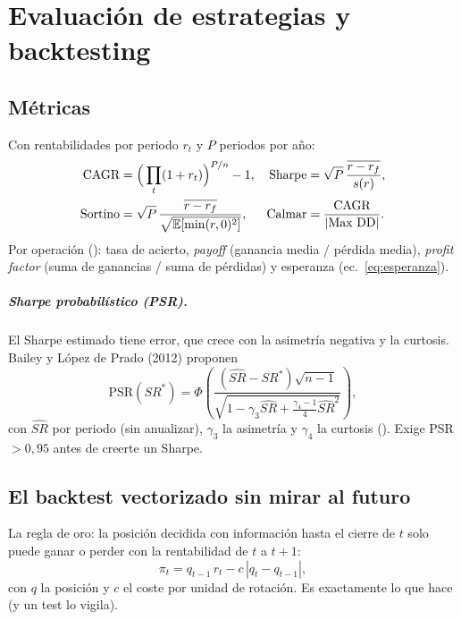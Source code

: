 \chapter{Evaluación de estrategias y backtesting}\label{cap:backtest}

\section{Métricas}
Con rentabilidades por periodo $r_t$ y $P$ periodos por año:
\begin{align*}
\text{CAGR} &= \Big(\prod_t (1+r_t)\Big)^{P/n}-1, &
\text{Sharpe} &= \sqrt{P}\,\frac{\overline{r - r_f}}{s(r)}, \\
\text{Sortino} &= \sqrt{P}\,\frac{\overline{r-r_f}}{\sqrt{\mathbb{E}[\min(r,0)^2]}}, &
\text{Calmar} &= \frac{\text{CAGR}}{|\text{Max DD}|}.
\end{align*}
Por operación (): tasa de acierto, \emph{payoff} (ganancia media / pérdida
media), \emph{profit factor} (suma de ganancias / suma de pérdidas) y esperanza (ec.~\ref{eq:esperanza}).

\paragraph{Sharpe probabilístico (PSR).} El Sharpe estimado tiene error, que crece con la asimetría
negativa y la curtosis. Bailey y López de Prado (2012) proponen
\begin{equation}
\text{PSR}(SR^*) = \Phi\!\left(\frac{(\widehat{SR}-SR^*)\sqrt{n-1}}{\sqrt{1-\gamma_3\widehat{SR}+\frac{\gamma_4-1}{4}\widehat{SR}^2}}\right),
\end{equation}
con $\widehat{SR}$ por periodo (sin anualizar), $\gamma_3$ la asimetría y $\gamma_4$ la curtosis
(). Exige PSR $>0{,}95$ antes de creerte un Sharpe.

\section{El backtest vectorizado sin mirar al futuro}
La regla de oro: la posición decidida con información hasta el cierre de $t$ solo puede ganar o perder
con la rentabilidad de $t$ a $t+1$:
\begin{equation}
\pi_t = q_{t-1}\, r_t - c\,|q_t - q_{t-1}| ,
\end{equation}
con $q$ la posición y $c$ el coste por unidad de rotación. Es exactamente lo que hace
 (y un test lo vigila).

